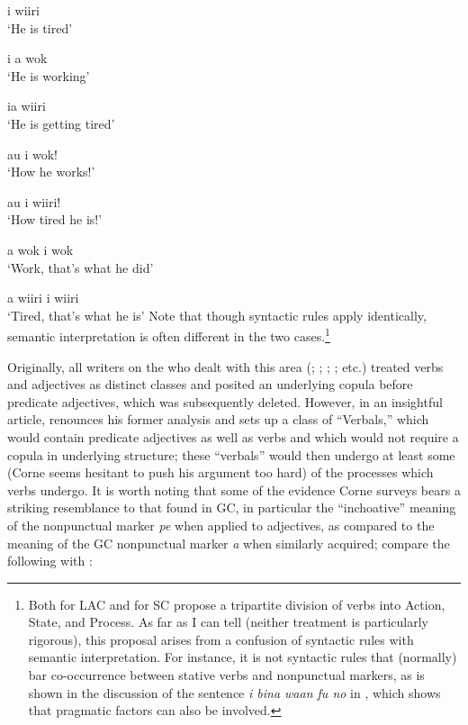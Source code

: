 \ea\label{ex:2:64}
 i wiiri\\
\glt `He is tired'
\z

\ea\label{ex:2:65}
i a wok\\
\glt `He is working'
\z

\ea\label{ex:2:66}
ia {wiiri}\\
\glt `He is getting tired'
\z

\ea\label{ex:2:67}
au i wok!\\
\glt `How he works!'
\z

\ea\label{ex:2:68}
{au} {i} {wiiri!}\\
\glt `How tired he is!'
\z

\ea\label{ex:2:69}
 {a} {wok} {i} {wok}\\
\glt `Work, that's what he did'
\z

\ea\label{ex:2:70}
{a} {wiiri} {i} {wiiri}\\
\glt `Tired, that's what he is' 
\z
Note that though syntactic rules apply identically, semantic interpre\-tation is often different in the two cases.\footnote{Both \citet{Christie1976} for LAC and \citet{Corne1981} for SC propose a tripartite division of verbs into Action, State, and Process. As far as I can tell (neither treatment is particularly rigorous), this proposal arises from a confusion of syntactic rules with semantic interpretation. For instance, it is not syntactic rules that (normally) bar co-occurrence between stative verbs and nonpunctual markers, as is shown in the discussion of the sentence \textit{i bina waan fu no} in \citet[38]{Bickerton1975}, which shows that pragmatic factors can also be involved.}

Originally, all writers on the  who dealt with this area (\citealt{Baker1972}; \citealt{Corne1973,Corne1977}; \citealt{Papen1975,Papen1978}; \citealt{Bollee1977}; etc.) treated verbs and adjectives as distinct classes and posited an underlying copula before predicate adjectives, which was subsequently deleted. However, in an insightful article, \citet{Corne1981} renounces his former analysis and sets up a class of ``Verbals,'' which would contain predicate adjectives as well as verbs and which would not require a copula in underlying structure; these ``verbals'' would then undergo at least some (Corne seems hesitant to push his argument too hard) of the processes which verbs undergo. It is worth noting that some of the evidence Corne surveys bears a striking resemblance to that found in GC, in particular the ``inchoative'' meaning of the nonpunctual marker \textit{pe} when applied to adjectives, as compared to the meaning of the GC nonpunctual marker \textit{a} when similarly acquired; compare the following with :


